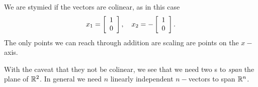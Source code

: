 We are stymied if the vectors are colinear, as in this case
\begin{equation}
  x_{1}=\mat{c}{1\\0}, \quad x_{2}=-\mat{c}{1\\0}.
\end{equation}
The only points we can reach through addition are scaling are points on the $x-$axis.

With the caveat that they not be colinear, we see that we need two \vv s to \textit{span} the plane of $\real{2}$. In general we need $n$ linearly independent $n-$vectors to span $\real{n}$.

\endinput